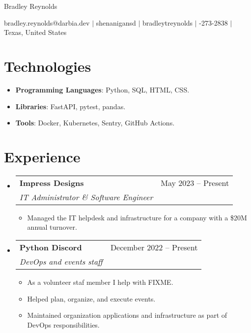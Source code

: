 \documentclass[letterpaper,11pt]{article}
\makeatletter
\newcommand{\resumeItem}[1]{
  \item\small{
    {#1 \vspace{-2pt}}
  }
}
\newcommand{\resumeSubheading}[4]{
  \vspace{-2pt}\item
    \begin{tabular*}{0.97\textwidth}[t]{l@{\extracolsep{\fill}}r}
      \textbf{#1} & #2 \\
      \textit{\small#3} & \textit{\small #4} \\
    \end{tabular*}\vspace{-7pt}
}
\newcommand{\resumeSubItem}[1]{\resumeItem{#1}\vspace{-4pt}}
\newcommand{\resumeSubheadingListStart}{\begin{itemize}[leftmargin=0.15in, label={}]}
\newcommand{\resumeSubheadingListEnd}{\end{itemize}}
\newcommand{\resumeItemListStart}{\begin{itemize}}
\newcommand{\resumeItemListEnd}{\end{itemize}}
\newcommand{\myemail}{bradley.reynolds@darbia.dev}
\newcommand{\myname}{Bradley Reynolds}
\newcommand{\mygh}{shenanigansd}
\newcommand{\mylinkedin}{bradleytreynolds}
\newcommand{\myphone}{940-273-2838}
\newcommand{\mylocation}{Texas, United States}
\newcommand{\myemail}{bradley.reynolds@darbia.dev}
\newcommand{\myname}{Bradley Reynolds}
\newcommand{\mygh}{shenanigansd}
\newcommand{\mylinkedin}{bradleytreynolds}
\newcommand{\myphone}{940-273-2838}
\newcommand{\mylocation}{Texas, United States}
\makeatother
\begin{document}
{\Huge \myname}
\\
\vspace{2pt}

\small{
    \faEnvelope
    \thinspace \thinspace
    \myemail
    \thinspace \thinspace $|$
    \faGithub
    \thinspace \thinspace
    \mygh
    \thinspace \thinspace $|$
    \faLinkedin
    \thinspace \thinspace
    \mylinkedin
    \thinspace \thinspace $|$
    \faPhone
    \thinspace \thinspace
    \myphone
    \thinspace \thinspace $|$
    \thinspace \thinspace
    \mylocation
}

\vspace{-11pt}

\section{Technologies}
\resumeSubheadingListStart
    \resumeSubItem{\textbf{Programming Languages}{:
        Python,
        SQL,
        HTML,
        CSS.
    }} \\
    \resumeSubItem{\textbf{Libraries}{:
        FastAPI,
        pytest,
        pandas.
    }} \\
    \resumeSubItem{\textbf{Tools}{:
        Docker,
        Kubernetes,
        Sentry,
        GitHub Actions.
    }}
\resumeSubheadingListEnd

\section{Experience}
    \resumeSubheadingListStart
        \resumeSubheading{Impress Designs}{May 2023 -- Present}{IT Administrator \& Software Engineer}{}
        \resumeItemListStart
            \resumeItem{Managed the IT helpdesk and infrastructure for a company with a \$20M annual turnover.}
        \resumeItemListEnd
    \resumeSubheadingListEnd
    \resumeSubheadingListStart
        \resumeSubheading{Python Discord}{December 2022 -- Present}{DevOps and events staff}{}
        \resumeItemListStart
            \resumeItem{As a volunteer staf member I help with FIXME.}
            \resumeItem{Helped plan, organize, and execute events.}
            \resumeItem{Maintained organization applications and infrastructure as part of DevOps responsibilities.}
        \resumeItemListEnd
    \resumeSubheadingListEnd
\end{document}
